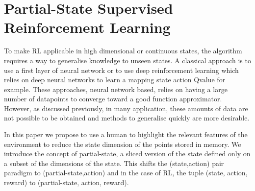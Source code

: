 \documentclass[letterpaper]{article} %
\begin{document}
\section{Partial-State Supervised Reinforcement Learning}

To make RL applicable in high dimensional or continuous states, the algorithm
requires a way to generalise knowledge to unseen states. 
A classical approach is to use a first layer of neural
network or to use deep reinforcement learning which relies on deep neural
networks to learn a mapping state action Qvalue for example. 
These approaches, neural network based, relies on having a large number of
datapoints to converge toward a good function approximator. However, as
discussed previously, in many application, these amounts of data are not
possible to be obtained and methods to generalise quickly are more desirable.


In this paper we propose to use a human to highlight the relevant features of
the environment to reduce the state dimension of the points stored in memory.
We introduce the concept of partial-state, a sliced version of the state defined
only on a subset of the dimensions of the state. This shifts the (state,action)
pair paradigm to (partial-state,action)  
and in the case of RL, the tuple (state, action, reward) to (partial-state,
action, reward).
\end{document}
